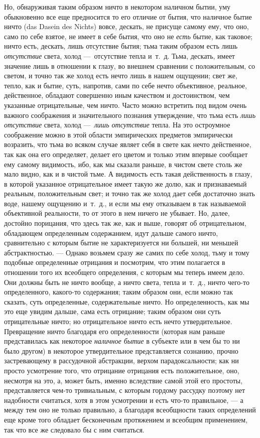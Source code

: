 Но, обнаруживая таким образом ничто в некотором наличном бытии, уму
обыкновенно все еще предносится то его отличие от бытия, что наличное бытие
ничто (das Dasein des Nichts) вовсе, дескать, не присуще самому ему, что
оно, само по себе взятое, не имеет в себе бытия, что оно не
{\em есть} бытие, как таковое; ничто есть, дескать,
лишь отсутствие бытия; тьма таким образом есть лишь
{\em отсутствие} света, холод ---~отсутствие тепла
и~т.~д. Тьма, дескать, имеет значение лишь в отношении к глазу, во внешнем
сравнении с положительным, со светом, и точно так же холод есть нечто лишь
в нашем ощущении; свет же, тепло, как и бытие, суть, напротив, сами по себе
нечто объективное, реальное, действенное, обладают совершенно иным
качеством и достоинством, чем указанные отрицательные, чем ничто. Часто
можно встретить под видом очень важного соображения и значительного
познания утверждение, что тьма есть {\em лишь
отсутствие} света, холод ---~{\em лишь отсутствие} тепла.
На это остроумное соображение можно в этой области эмпирических предметов
эмпирически возразить, что тьма во всяком случае являет себя в свете как
нечто действенное, так как она его определяет, делает его цветом и только
этим впервые сообщает ему самому видимость, ибо, как мы сказали раньше, в
чистом свете столь же мало видно, как и в чистой тьме. А видимость есть
такая действенность в глазу, в которой указанное отрицательное имеет такую
же долю, как и признаваемый реальным, положительным свет; и точно так же
холод дает себя достаточно знать воде, нашему ощущению и~т.~д., и если мы
ему отказываем в так называемой объективной реальности, то от этого в нем
ничего не убывает. Но, далее, достойно порицания, что здесь так же, как и
выше, говорят об отрицательном, обладающем определенным содержанием, идут
дальше самого ничто, сравнительно с которым бытие не характеризуется ни
большей, ни меньшей абстрактностью. --- Однако возьмем сразу же самих по себе
холод, тьму и тому подобные определенные отрицания и посмотрим, что этим
полагается в отношении того их всеобщего определения, с которым мы теперь
имеем дело. Они должны быть не ничто вообще, а ничто света, тепла и~т.~д.,
ничто чего-то определенного, какого-то содержания; таким образом они, если
можно так сказать, суть определенные, содержательные ничто. Но
определенность, как мы это еще увидим дальше, сама есть отрицание; таким
образом они суть отрицательные ничто; но отрицательное ничто есть нечто
утвердительное. Превращение ничто благодаря его определенности (которая нам
раньше представилась как некоторое {\em наличное бытие}
в субъекте или в чем бы то ни было другом) в некоторое утвердительное
представляется сознанию, прочно застревающему в рассудочной абстракции,
верхом парадоксальности; как ни просто усмотрение того, что отрицание
отрицания есть положительное, оно, несмотря на это, а, может быть, именно
вследствие самой этой его простоты, представляется чем-то тривиальным, с
которым гордому рассудку поэтому нет надобности считаться, хотя в этом
усмотрении и есть что-то правильное, --- а между тем оно не только правильно,
а благодаря всеобщности таких определений еще кроме того обладает
бесконечным протяжением и всеобщим применением, так что все же следовало бы
с ним считаться.

